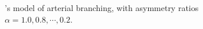 \documentclass[a4paper, 11pt]{article}
\begin{document}
\begin{flushleft}
\begin{figure}[h]
\centering
\caption{\citeauthor{zamirArterialBranchingLSystems}'s model of arterial branching, with asymmetry ratios $\alpha = 1.0, 0.8, \cdots, 0.2$.}
\label{Zamir Branching}
\end{figure}





\end{flushleft}
\end{document}
